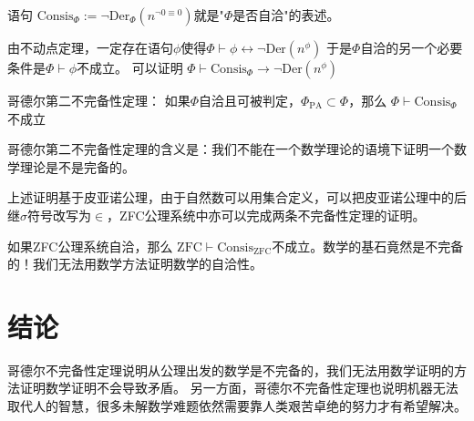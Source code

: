 		 语句 $\text{Consis}_{\Phi} := \lnot \text{Der}_\Phi(n^{\lnot 0\equiv0})$就是"$\Phi$是否自洽"的表述。

     由不动点定理，一定存在语句$\phi$使得$\Phi \vdash \phi  \leftrightarrow \lnot \text{Der}(n^{\phi})$
     于是$\Phi$自洽的另一个必要条件是$\Phi \vdash \phi$不成立。
		 可以证明
		 $\Phi \vdash \text{Consis}_\Phi \rightarrow \lnot \text{Der}(n^\phi)$


		 哥德尔第二不完备性定理：
		 如果$\Phi$自洽且可被判定，$\Phi_\text{PA} \subset \Phi$，那么
		 $\Phi \vdash \text{Consis}_{\Phi}$不成立


    哥德尔第二不完备性定理的含义是：我们不能在一个数学理论的语境下证明一个数学理论是不是完备的。

		上述证明基于皮亚诺公理，由于自然数可以用集合定义，可以把皮亚诺公理中的后继$\sigma$符号改写为$\in$，ZFC公理系统中亦可以完成两条不完备性定理的证明。

		如果ZFC公理系统自洽，那么 $\text{ZFC} \vdash \text{Consis}_\text{ZFC}$不成立。数学的基石竟然是不完备的！我们无法用数学方法证明数学的自洽性。

\section{结论}
     	哥德尔不完备性定理说明从公理出发的数学是不完备的，我们无法用数学证明的方法证明数学证明不会导致矛盾。
      另一方面，哥德尔不完备性定理也说明机器无法取代人的智慧，很多未解数学难题依然需要靠人类艰苦卓绝的努力才有希望解决。
